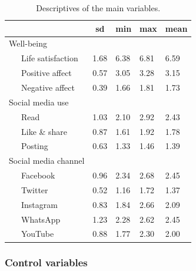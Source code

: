 \documentclass[
  english,
  man,floatsintext]{apa6}
\begin{document}
\begin{table}[tbp]

\begin{center}
\begin{threeparttable}

\caption{\label{tab:descriptives}Descriptives of the main variables.}

\begin{tabular}{lllll}
\toprule
 & \multicolumn{1}{c}{sd} & \multicolumn{1}{c}{min} & \multicolumn{1}{c}{max} & \multicolumn{1}{c}{mean}\\
\midrule
Well-being &  &  &  & \\
\ \ \ Life satisfaction & 1.68 & 6.38 & 6.81 & 6.59\\
\ \ \ Positive affect & 0.57 & 3.05 & 3.28 & 3.15\\
\ \ \ Negative affect & 0.39 & 1.66 & 1.81 & 1.73\\
Social media use &  &  &  & \\
\ \ \ Read & 1.03 & 2.10 & 2.92 & 2.43\\
\ \ \ Like \& share & 0.87 & 1.61 & 1.92 & 1.78\\
\ \ \ Posting & 0.63 & 1.33 & 1.46 & 1.39\\
Social media channel &  &  &  & \\
\ \ \ Facebook & 0.96 & 2.34 & 2.68 & 2.45\\
\ \ \ Twitter & 0.52 & 1.16 & 1.72 & 1.37\\
\ \ \ Instagram & 0.83 & 1.84 & 2.66 & 2.09\\
\ \ \ WhatsApp & 1.23 & 2.28 & 2.62 & 2.45\\
\ \ \ YouTube & 0.88 & 1.77 & 2.30 & 2.00\\
\bottomrule
\end{tabular}

\end{threeparttable}
\end{center}

\end{table}

\hypertarget{control-variables}{%
\subsubsection{Control variables}\label{control-variables}}
\end{document}
